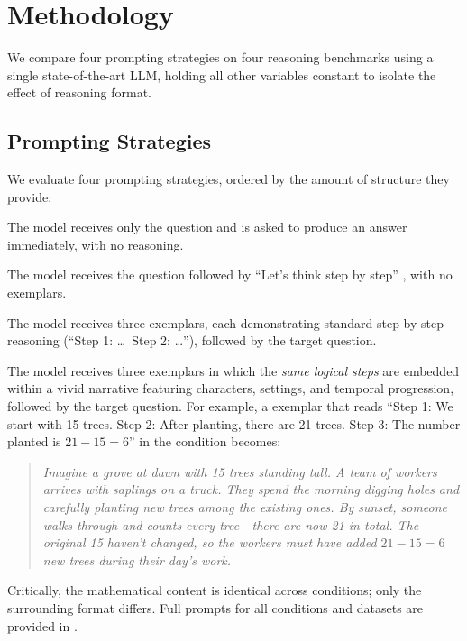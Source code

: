 \section{Methodology}
\label{sec:method}

We compare four prompting strategies on four reasoning benchmarks using a single state-of-the-art LLM, holding all other variables constant to isolate the effect of reasoning format.

\subsection{Prompting Strategies}
\label{sec:prompts}

We evaluate four prompting strategies, ordered by the amount of structure they provide:

 The model receives only the question and is asked to produce an answer immediately, with no reasoning.

 The model receives the question followed by ``Let's think step by step'' \citep{kojima2022large}, with no exemplars.

 The model receives three exemplars, each demonstrating standard step-by-step reasoning (``Step 1: \ldots\ Step 2: \ldots''), followed by the target question.

 The model receives three exemplars in which the \emph{same logical steps} are embedded within a vivid narrative featuring characters, settings, and temporal progression, followed by the target question. For example, a \gsm exemplar that reads ``Step 1: We start with 15 trees. Step 2: After planting, there are 21 trees. Step 3: The number planted is $21 - 15 = 6$'' in the \fewshotcot condition becomes:

\begin{quote}
\small
\emph{Imagine a grove at dawn with 15 trees standing tall. A team of workers arrives with saplings on a truck. They spend the morning digging holes and carefully planting new trees among the existing ones. By sunset, someone walks through and counts every tree---there are now 21 in total. The original 15 haven't changed, so the workers must have added $21 - 15 = 6$ new trees during their day's work.}
\end{quote}

Critically, the mathematical content is identical across conditions; only the surrounding format differs. Full prompts for all conditions and datasets are provided in .

